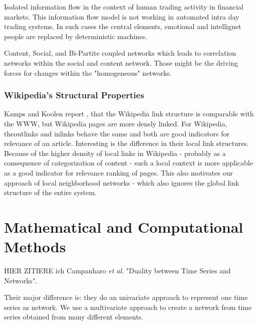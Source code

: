 \documentclass[a4paper,10pt]{scrbook}
\begin{document}
Isolated information flow in the context of human trading activity in financial markets. This information flow model is not working in automated intra day trading systems. In such cases the central elements, emotional and intellignet people are replaced by deterministic machines. 

Content, Social, and Bi-Partite coupled networks which leads to correlation networks within the social and content network. Those might be the driving forces for changes within the "homogeneous" networks.  


\subsection{Wikipedia's Structural Properties}
Kamps and Koolen report \cite{Kamps2009}, that the Wikipedia link structure is comparable with the WWW, but Wikipedia pages are more densly linked. For Wikipedia, theoutlinks and inlinks behave the same and both are good indicators for relevance of an article. Interesting is the difference in their local link structures. Because of the higher density of local links in Wikipedia - probably as a consequence of categorization of content - such a local context is more applicable as a good indicator for relevance ranking of pages. This also motivates our approach of local neighborhood networks - which also ignores the global link structure of the entire system. 

\newpage

\chapter{Mathematical and Computational Methods}
\label{chap.Math}

HIER ZITIERE ich Campanharo \textit{et al.} \cite{Campanharo2011} "Duality between Time Series and Networks".

Their major difference is: they do an univariate approach to represent one time series as network. We use a multivariate approach to create a network from time series obtained from many different elements.
\end{document}
